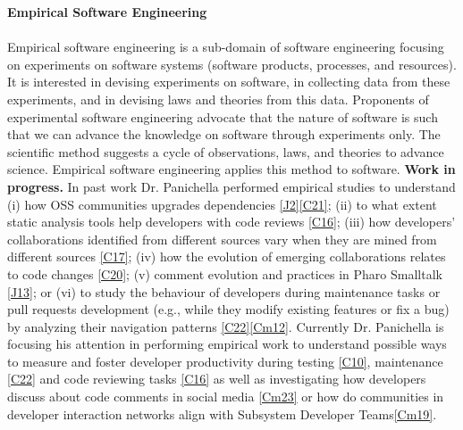 \documentclass[10pt]{article}
\newcommand{\blankline}{\quad\pagebreak[3]}
\begin{document}
\textbf{Empirical Software Engineering}
\blankline\\\\
Empirical software engineering is a sub-domain of software engineering focusing on experiments on software systems (software products, processes, and resources). It is interested in devising experiments on software, in collecting data from these experiments, and in devising laws and theories from this data. Proponents of experimental software engineering advocate that the nature of software is such that we can advance the knowledge on software through experiments only. The scientific method suggests a cycle of observations, laws, and theories to advance science. Empirical software engineering applies this method to software.
   \textbf{Work in progress.} In past work Dr. Panichella performed empirical studies to understand (i) how   OSS communities upgrades dependencies \ref{J2}\ref{C21};   
   (ii) to what extent static analysis tools help developers with code reviews \ref{C16};  (iii)  how developers' collaborations identified from different sources vary when they are mined from different sources \ref{C17};  (iv) how the evolution of emerging collaborations relates to code changes \ref{C20}; (v) comment evolution and practices in Pharo Smalltalk \ref{J13}; or (vi) to study
   the behaviour of developers during maintenance tasks or pull requests development (e.g., while they modify existing features or fix a bug) by analyzing their navigation patterns  \ref{C22}\ref{Cm12}. Currently Dr. Panichella is focusing his attention in performing empirical work to understand possible ways to measure and foster developer  productivity during testing \ref{C10}, maintenance \ref{C22} and code reviewing tasks  \ref{C16} as well as investigating how developers discuss about code comments in social media \ref{Cm23} or how do communities in developer interaction networks align with Subsystem Developer Teams\ref{Cm19}.
   \\
   
\end{document}
